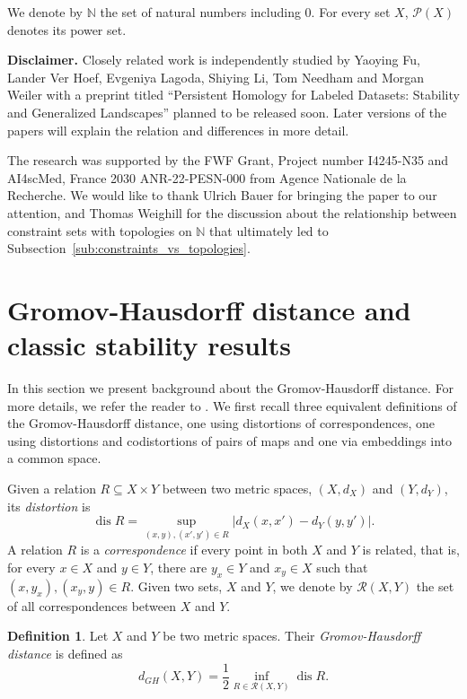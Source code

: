 \documentclass[8pt,a4paper,oneside,english,english]{article}
\theoremstyle{plain}
\theoremstyle
{plain}
\theoremstyle{definition}
\newtheorem{definition}[theorem]{Definition}%
\newcommand{\N}{\mathbb{N}}
\newcommand{\GH}{d_{GH}}
\DeclareMathOperator{\dis}{dis}
\begin{document}
\medskip
{} We denote by $\N$ the set of natural numbers including $0$. For every set $X$, $\mathcal P(X)$ denotes its power set.

\medskip
\noindent \textbf{Disclaimer.} Closely related work is independently studied by Yaoying Fu, Lander Ver Hoef, Evgeniya Lagoda, Shiying Li, Tom Needham and Morgan Weiler with a preprint titled ``Persistent Homology for Labeled Datasets: Stability and Generalized Landscapes'' planned to be released soon. Later versions of the papers will explain the relation and differences in more detail.

\medskip
{}

The research was supported by the FWF Grant, Project number I4245-N35 and AI4scMed, France 2030 ANR-22-PESN-000 from Agence Nationale de la Recherche. We would like to thank Ulrich Bauer for bringing the paper \cite{Mem_tripods} to our attention, and Thomas Weighill for the discussion about the relationship between constraint sets with topologies on $\N$ that ultimately led to Subsection~\ref{sub:constraints_vs_topologies}.

\section{Gromov-Hausdorff distance and classic stability results}\label{sec:background}

In this section we present background about the Gromov-Hausdorff distance. For more details, we refer the reader to \cite{BurBurIva,Tuz,Pet}. 
We first recall three equivalent definitions of the Gromov-Hausdorff distance, one using distortions of correspondences, one using distortions and codistortions of pairs of maps and one via embeddings into a common space.

Given a relation $R\subseteq X\times Y$ between two metric spaces, $(X, d_X)$ and $(Y, d_Y)$, its {\em distortion} is \[
    \dis R =
    \sup_{(x,y), (x',y')\in {R}}
    \lvert d_X(x,x')-d_Y(y,y')\rvert.
\]
A relation $R$ is a {\em correspondence} if every point in both $X$ and $Y$ is related, that is, for every $x\in X$ and $y\in Y$, there are $y_x\in Y$ and $x_y\in X$ such that $(x,y_x),(x_y,y)\in R$. Given two sets, $X$ and $Y$, we denote by $\mathcal R(X,Y)$ the set of all correspondences between $X$ and $Y$.


\begin{definition}\label{def:GH-distance}
    Let $X$ and $Y$ be two metric spaces. Their {\em Gromov-Hausdorff distance} is defined as \[
        \GH(X,Y)=\frac{1}{2}
        \inf_{R\in\mathcal R(X,Y)}
        \dis R.
    \]
\end{definition}
\end{document}
